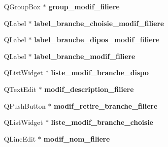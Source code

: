 \begin{DoxyCompactItemize}
\item 
\hypertarget{class_ui___administration_a1c19df7bf5844539a842896b0c3af0c0}{Q\+Group\+Box $\ast$ {\bfseries group\+\_\+modif\+\_\+filiere}}\label{class_ui___administration_a1c19df7bf5844539a842896b0c3af0c0}

\item 
\hypertarget{class_ui___administration_a9e60f5d5cd7f7920d173e6326c6d1d97}{Q\+Label $\ast$ {\bfseries label\+\_\+branche\+\_\+choisie\+\_\+modif\+\_\+filiere}}\label{class_ui___administration_a9e60f5d5cd7f7920d173e6326c6d1d97}

\item 
\hypertarget{class_ui___administration_ad266b2691f964fdd82a0184da661af26}{Q\+Label $\ast$ {\bfseries label\+\_\+branche\+\_\+dipos\+\_\+modif\+\_\+filiere}}\label{class_ui___administration_ad266b2691f964fdd82a0184da661af26}

\item 
\hypertarget{class_ui___administration_ac51fce605599087e7d32911a93165ab8}{Q\+Label $\ast$ {\bfseries label\+\_\+branche\+\_\+modif\+\_\+filiere}}\label{class_ui___administration_ac51fce605599087e7d32911a93165ab8}

\item 
\hypertarget{class_ui___administration_a75152d82418998323d899e84cd597af3}{Q\+List\+Widget $\ast$ {\bfseries liste\+\_\+modif\+\_\+branche\+\_\+dispo}}\label{class_ui___administration_a75152d82418998323d899e84cd597af3}

\item 
\hypertarget{class_ui___administration_a50e6f3d6a67ee26670035b2daefaed36}{Q\+Text\+Edit $\ast$ {\bfseries modif\+\_\+description\+\_\+filiere}}\label{class_ui___administration_a50e6f3d6a67ee26670035b2daefaed36}

\item 
\hypertarget{class_ui___administration_a8aa6115375f8ea0ff1fd8ff3aff7ea28}{Q\+Push\+Button $\ast$ {\bfseries modif\+\_\+retire\+\_\+branche\+\_\+filiere}}\label{class_ui___administration_a8aa6115375f8ea0ff1fd8ff3aff7ea28}

\item 
\hypertarget{class_ui___administration_a09c76144b8426021c3e6057c41002196}{Q\+List\+Widget $\ast$ {\bfseries liste\+\_\+modif\+\_\+branche\+\_\+choisie}}\label{class_ui___administration_a09c76144b8426021c3e6057c41002196}

\item 
\hypertarget{class_ui___administration_a9199eeec2bc6d107c7500a514b3cc90d}{Q\+Line\+Edit $\ast$ {\bfseries modif\+\_\+nom\+\_\+filiere}}\label{class_ui___administration_a9199eeec2bc6d107c7500a514b3cc90d}


\end{DoxyCompactItemize}
